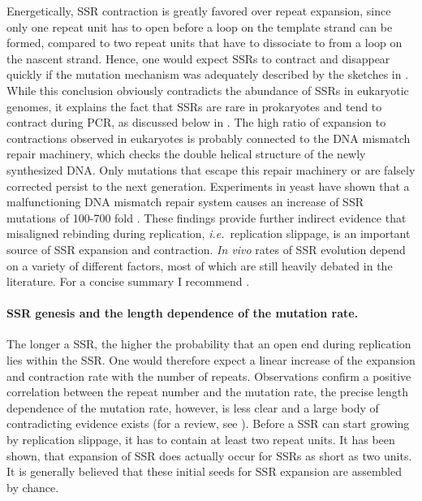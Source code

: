 Energetically, SSR contraction is greatly favored over repeat expansion, since 
only one repeat unit has to open before a loop on the template strand can be formed, compared
to two repeat units that have to dissociate to from a loop on the nascent strand. 
Hence, one would expect SSRs to contract  and disappear quickly if the mutation mechanism was 
adequately described by the sketches in .
While this conclusion obviously contradicts
the abundance of SSRs in eukaryotic genomes, it explains the fact that SSRs are rare in prokaryotes and 
tend to contract during PCR, as discussed below in .
The high ratio of expansion to contractions observed in eukaryotes is probably connected to the DNA mismatch repair machinery, which 
checks the double helical structure of the newly synthesized DNA. Only mutations
that escape this repair machinery or are falsely corrected persist to the next generation. Experiments in 
yeast have shown that a malfunctioning DNA mismatch repair system causes an increase 
of SSR mutations of 100-700 fold \cite{Strand_Nature_93}. These findings provide further indirect evidence that
misaligned rebinding during replication, \emph{i.e.}~replication slippage, is an important source of
SSR expansion and contraction. \emph{In vivo} rates of SSR evolution depend on a variety of different 
factors, most of which are still heavily debated in the literature. For a concise summary I recommend
.

\paragraph{SSR genesis and the length dependence of the mutation rate.}
The longer a SSR, the higher the probability that an open end during replication lies within
the SSR. One would therefore expect a linear increase of the expansion and contraction rate with
the number of repeats. Observations confirm a positive correlation between the 
repeat number and the mutation rate, the precise length dependence of the mutation rate, however,
is less clear and a large body of contradicting evidence exists (for a review, see \cite{Ellegren_NRG_04}).
Before a SSR can start growing by replication slippage, it has to contain at least two repeat
units.
It has been shown, that expansion of SSR does actually occur 
for SSRs as short as two units. It is generally believed that these initial seeds for SSR expansion are
assembled by chance.

